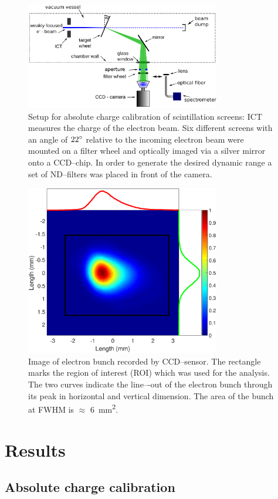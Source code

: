 \documentclass[%
reprint,
amsmath,
amssymb,
aip,
rsi, 
numerical,
floatfix,
]{revtex4-1}
\begin{document}
\begin{figure}
\includegraphics[width=8.5cm]{./Figures/Setup_V3}%
\caption{\label{fig:Setup}Setup for absolute charge calibration of scintillation screens: ICT measures the charge of the electron beam. 
Six different screens with an angle of $22\degree$ relative to the incoming electron beam were mounted on a filter wheel and optically imaged via a silver mirror onto a CCD--chip.
In order to generate the desired dynamic range a set of ND--filters was placed in front of the camera.}
\end{figure}
\begin{figure}
\includegraphics[width=8.5cm]{./Figures/electron_bunch}%
\caption{\label{fig:electron_bunch}
Image of electron bunch recorded by CCD–sensor. 
The rectangle marks the region of interest (ROI) which was used for the analysis. 
The two curves indicate the line–-out of the electron bunch through its peak in
horizontal and vertical dimension. 
The area of the bunch at FWHM is $\approx$ \SI{6}{\square\milli\meter}.}
\end{figure}

\section{\label{Res} Results}
\subsection{\label{Ac} Absolute charge calibration}
\end{document}
